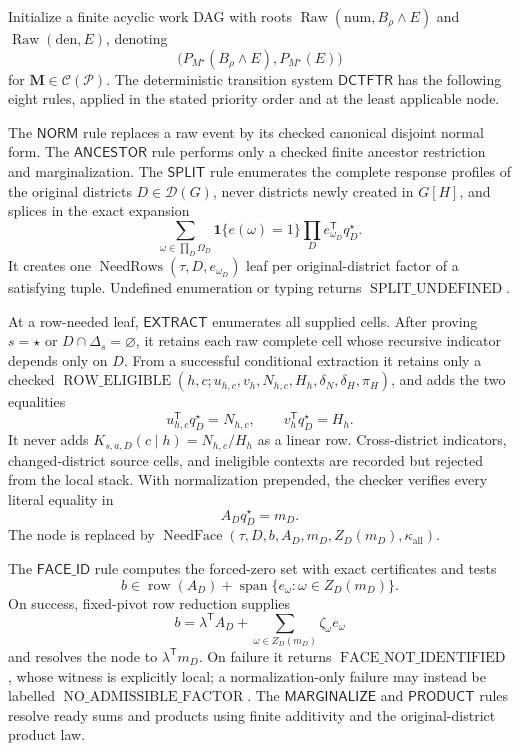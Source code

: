 Initialize a finite acyclic work DAG with roots \(\operatorname{Raw}(\mathrm{num},B_\rho\wedge E)\) and \(\operatorname{Raw}(\mathrm{den},E)\), denoting
\[
\bigl(P_{M^\star}(B_\rho\wedge E),P_{M^\star}(E)\bigr)
\]
for \(\mathbf M\in\mathcal C(\mathcal P)\).  The deterministic transition system \(\mathsf{DCTFTR}\) has the following eight rules, applied in the stated priority order and at the least applicable node.

The \(\mathsf{NORM}\) rule replaces a raw event by its checked canonical disjoint normal form.  The \(\mathsf{ANCESTOR}\) rule performs only a checked finite ancestor restriction and marginalization.  The \(\mathsf{SPLIT}\) rule enumerates the complete response profiles of the original districts \(D\in\mathcal D(G)\), never districts newly created in \(G[H]\), and splices in the exact expansion
\[
\sum_{\omega\in\prod_D\Omega_D}
\mathbf 1\{e(\omega)=1\}
\prod_D e_{\omega_D}^{\mathsf T}q_D^\star.
\]
It creates one \(\operatorname{NeedRows}(\tau,D,e_{\omega_D})\) leaf per original-district factor of a satisfying tuple.  Undefined enumeration or typing returns \(\operatorname{SPLIT\_UNDEFINED}\).

At a row-needed leaf, \(\mathsf{EXTRACT}\) enumerates all supplied cells.  After proving \(s=\star\) or \(D\cap\Delta_s=\varnothing\), it retains each raw complete cell whose recursive indicator depends only on \(D\).  From a successful conditional extraction it retains only a checked \(\operatorname{ROW\_ELIGIBLE}(h,c;u_{h,c},v_h,N_{h,c},H_h,\delta_N,\delta_H,\pi_H)\), and adds the two equalities
\[
u_{h,c}^{\mathsf T}q_D^\star=N_{h,c},
\qquad
v_h^{\mathsf T}q_D^\star=H_h.
\]
It never adds \(K_{s,a,D}(c\mid h)=N_{h,c}/H_h\) as a linear row.  Cross-district indicators, changed-district source cells, and ineligible contexts are recorded but rejected from the local stack.  With normalization prepended, the checker verifies every literal equality in
\[
A_Dq_D^\star=m_D.
\]
The node is replaced by \(\operatorname{NeedFace}(\tau,D,b,A_D,m_D,Z_D(m_D),\kappa_{\mathrm{all}})\).

The \(\mathsf{FACE\_ID}\) rule computes the forced-zero set with exact certificates and tests
\[
b\in\operatorname{row}(A_D)+
\operatorname{span}\{e_\omega:\omega\in Z_D(m_D)\}.
\]
On success, fixed-pivot row reduction supplies
\[
b=\lambda^{\mathsf T}A_D+
\sum_{\omega\in Z_D(m_D)}\zeta_\omega e_\omega
\]
and resolves the node to \(\lambda^{\mathsf T}m_D\).  On failure it returns \(\operatorname{FACE\_NOT\_IDENTIFIED}\), whose witness is explicitly local; a normalization-only failure may instead be labelled \(\operatorname{NO\_ADMISSIBLE\_FACTOR}\).  The \(\mathsf{MARGINALIZE}\) and \(\mathsf{PRODUCT}\) rules resolve ready sums and products using finite additivity and the original-district product law.


